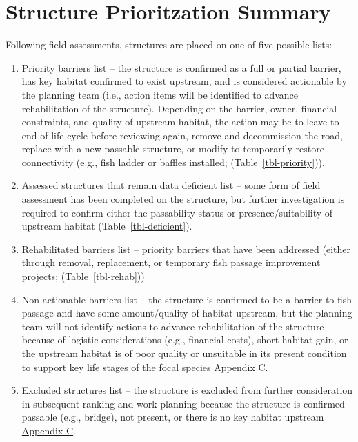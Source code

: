\documentclass[
  letterpaper,
  DIV=11,
  numbers=noendperiod]{scrreprt}
\begin{document}
\section*{Structure Prioritzation
Summary}\label{structure-prioritzation-summary}


Following field assessments, structures are placed on one of five
possible lists:

\begin{enumerate}
\def\labelenumi{\arabic{enumi}.}
\item
  Priority barriers list -- the structure is confirmed as a full or
  partial barrier, has key habitat confirmed to exist upstream, and is
  considered actionable by the planning team (i.e., action items will be
  identified to advance rehabilitation of the structure). Depending on
  the barrier, owner, financial constraints, and quality of upstream
  habitat, the action may be to leave to end of life cycle before
  reviewing again, remove and decommission the road, replace with a new
  passable structure, or modify to temporarily restore connectivity
  (e.g., fish ladder or baffles installed; (Table~\ref{tbl-priority})).
\item
  Assessed structures that remain data deficient list -- some form of
  field assessment has been completed on the structure, but further
  investigation is required to confirm either the passability status or
  presence/suitability of upstream habitat (Table~\ref{tbl-deficient}).
\item
  Rehabilitated barriers list -- priority barriers that have been
  addressed (either through removal, replacement, or temporary fish
  passage improvement projects; (Table~\ref{tbl-rehab}))
\item
  Non-actionable barriers list -- the structure is confirmed to be a
  barrier to fish passage and have some amount/quality of habitat
  upstream, but the planning team will not identify actions to advance
  rehabilitation of the structure because of logistic considerations
  (e.g., financial costs), short habitat gain, or the upstream habitat
  is of poor quality or unsuitable in its present condition to support
  key life stages of the focal species \href{data-methods.qmd}{Appendix
  C}.
\item
  Excluded structures list -- the structure is excluded from further
  consideration in subsequent ranking and work planning because the
  structure is confirmed passable (e.g., bridge), not present, or there
  is no key habitat upstream \href{data-methods.qmd}{Appendix C}.
\end{enumerate}
\end{document}
